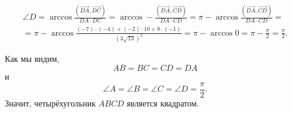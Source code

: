 \begin{multline*}
\angle D=\arccos\frac{\left(\overrightarrow{DA},\overrightarrow{DC}\right)}{DA\cdot DC}=\arccos-\frac{\left(\overrightarrow{DA},\overrightarrow{CD}\right)}{DA\cdot CD}=\pi-\arccos\frac{\left(\overrightarrow{DA},\overrightarrow{CD}\right)}{DA\cdot CD}= \\
=\pi-\arccos\frac{(-7)\cdot(-4)+(-2)\cdot10+8\cdot(-1)}{\left(3\sqrt{13}\right)^2}=\pi-\arccos0=\pi-\frac{\pi}{2}=\frac{\pi}{2}.
\end{multline*}

Как мы видим,
\[
AB=BC=CD=DA
\]
и
\[
\angle A=\angle B=\angle C=\angle D=\frac{\pi}{2}.
\]
Значит, четырёхугольник $ABCD$ является квадратом.